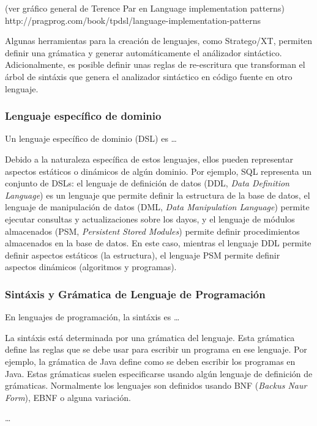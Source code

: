 (ver gráfico general de Terence Par en Language implementation patterns)
http://pragprog.com/book/tpdsl/language-implementation-patterns

Algunas herramientas para la creación de lenguajes, como Stratego/XT, permiten definir una grámatica y generar automáticamente el análizador sintáctico.
Adicionalmente, es posible definir unas reglas de re-escritura que transforman el árbol de sintáxis que genera el analizador sintáctico en código fuente en otro lenguaje.

\subsubsection{Lenguaje específico de dominio}

Un lenguaje específico de dominio (DSL) es \ldots

Debido a la naturaleza específica de estos lenguajes, ellos pueden representar aspectos estáticos o dinámicos de algún dominio.
Por ejemplo, SQL representa un conjunto de DSLs:
el lenguaje de definición de datos (DDL, \textit{Data Definition Language}) es un lenguaje que permite definir la estructura de la base de datos,
el lenguaje de manipulación de datos (DML, \textit{Data Manipulation Language}) permite ejecutar consultas y actualizaciones sobre los dayos,
y el lenguaje de módulos almacenados (PSM, \textit{Persistent Stored Modules}) permite definir procedimientos almacenados en la base de datos.
En este caso, mientras el lenguaje DDL permite definir aspectos estáticos (la estructura), el lenguaje PSM permite definir aspectos dinámicos (algoritmos y programas).   

\subsubsection{Sintáxis y Grámatica de Lenguaje de Programación}

En lenguajes de programación, la sintáxis es \ldots

La sintáxis está determinada por una grámatica del lenguaje.
Esta grámatica define las reglas que se debe usar para escribir un programa en ese lenguaje.
Por ejemplo, la grámatica de Java define como se deben escribir los programas en Java.
Estas grámaticas suelen especificarse usando algún lenguaje de definición de grámaticas. 
Normalmente los lenguajes son definidos usando BNF (\textit{Backus Naur Form}), EBNF o alguna variación.

\ldots



